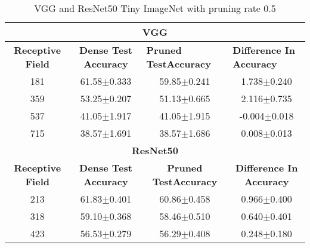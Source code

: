 \begin{table}[H]
\begin{tabular}{@{}cccc@{}}
\toprule
\multicolumn{4}{c}{\textbf{VGG}}                                                                                                                                  \\ \midrule
\textbf{Receptive Field} & \textbf{Dense Test Accuracy} & \multicolumn{1}{l}{\textbf{Pruned  TestAccuracy}} & \multicolumn{1}{l}{\textbf{Difference In Accuracy}} \\ \midrule
181                      & 61.58$\pm$0.333              & 59.85$\pm$0.241                                   & 1.738$\pm$0.240                                     \\
359                      & 53.25$\pm$0.207              & 51.13$\pm$0.665                                   & 2.116$\pm$0.735                                     \\
537                      & 41.05$\pm$1.917              & 41.05$\pm$1.915                                   & -0.004$\pm$0.018                                    \\
715                      & 38.57$\pm$1.691              & 38.57$\pm$1.686                                   & 0.008$\pm$0.013                                     \\ \midrule
\multicolumn{4}{c}{\textbf{ResNet50}}                                                                                                                             \\ \midrule
\textbf{Receptive Field} & \textbf{Dense Test Accuracy} & \textbf{Pruned  TestAccuracy}                     & \textbf{Difference In Accuracy}                     \\
213                      & 61.83$\pm$0.401              & 60.86$\pm$0.458                                   & 0.966$\pm$0.400                                     \\
318                      & 59.10$\pm$0.368              & 58.46$\pm$0.510                                   & 0.640$\pm$0.401                                     \\
423                      & 56.53$\pm$0.279              & 56.29$\pm$0.408                                   & 0.248$\pm$0.180                                     \\ \bottomrule
\end{tabular}
\caption{VGG and ResNet50 Tiny ImageNet with pruning rate 0.5}
\label{tab:tiny imagenet pruning rate06}
\end{table}

